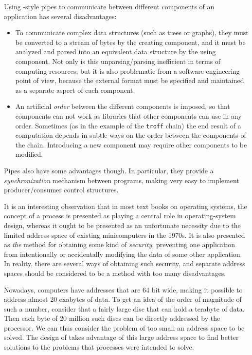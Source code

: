 Using \unix{}-style pipes to communicate between different components of
an application has several disadvantages:

\begin{itemize}
\item To communicate complex data structures (such as trees or
graphs), they must be converted to a stream of bytes by the
creating component, and it must be analyzed and parsed into an
equivalent data structure by the using component.  Not only is
this unparsing/parsing inefficient in terms of computing
resources, but it is also problematic from a
software-engineering point of view, because the external format
must be specified and maintained as a separate aspect of each
component.
\item An artificial \emph{order} between the different components is
imposed, so that components can not work as libraries that other
components can use in any order.  Sometimes (as in the example
of the \texttt{troff} chain) the end result of a computation
depends in subtle ways on the order between the components of
the chain.  Introducing a new component may require other
components to be modified.  
\end{itemize}

Pipes also have some advantages though.  In particular, they provide a
\emph{synchronization} mechanism between programs, making very easy to
implement producer/consumer control structures.

It is an interesting observation that in most text books on
operating systems, the concept of a process is presented as playing
a central role in operating-system design, whereas it ought to be
presented as an unfortunate necessity due to the limited address
space of existing minicomputers in the 1970s.  It is also presented
as \emph{the} method for obtaining some kind of \emph{security},
preventing one application from intentionally or accidentally
modifying the data of some other application.  In reality, there are
several ways of obtaining such security, and separate address spaces
should be considered to be a method with too many disadvantages. 

Nowadays, computers have addresses that are 64 bit wide, making it
possible to address almost 20 exabytes of data.  To get an idea of the
order of magnitude of such a number, consider that a fairly large disc
that can hold a terabyte of data.  Then each byte of 20 million such
discs can be directly addressed by the processor.  We can thus
consider the problem of too small an address space to be solved.  The
design of \sysname{} takes advantage of this large address space to
find better solutions to the problems that processes were intended to
solve.


